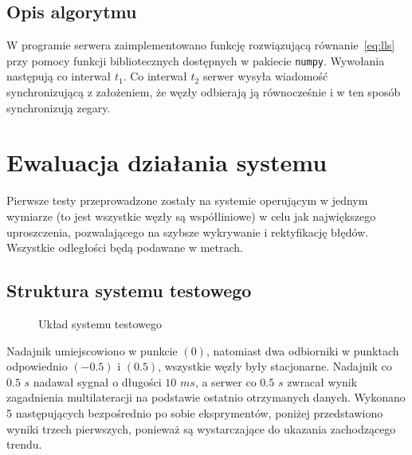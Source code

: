\subsection{Opis algorytmu}

W programie serwera zaimplementowano funkcję rozwiązującą równanie~\ref{eq:lls} przy pomocy funkcji bibliotecznych dostępnych w pakiecie \texttt{numpy}. Wywołania następują co interwał $t_1$. Co interwał $t_2$ serwer wysyła wiadomość synchronizującą z założeniem, że węzły odbierają ją równocześnie i w ten sposób synchronizują zegary.

\section{Ewaluacja działania systemu}

Pierwsze testy przeprowadzone zostały na systemie operującym w jednym wymiarze (to jest wszystkie węzły są współliniowe) w celu jak największego uproszczenia, pozwalającego na szybsze wykrywanie i rektyfikację błędów. Wszystkie odległości będą podawane w metrach.

\subsection{Struktura systemu testowego}

\begin{figure}[h]
    \centering
    \caption{Układ systemu testowego}
    \label{fig:test_setup}
\end{figure}

Nadajnik umiejscowiono w punkcie $(0)$, natomiast dwa odbiorniki w punktach odpowiednio $(-0.5)$ i $(0.5)$, wszystkie węzły były stacjonarne. Nadajnik co $0.5$ $s$ nadawał sygnał o długości $10$ $ms$, a serwer co $0.5$ $s$ zwracał wynik zagadnienia multilateracji na podstawie ostatnio otrzymanych danych. Wykonano 5 następujących bezpośrednio po sobie eksprymentów, poniżej przedstawiono wyniki trzech pierwszych, ponieważ są wystarczające do ukazania zachodzącego trendu.

